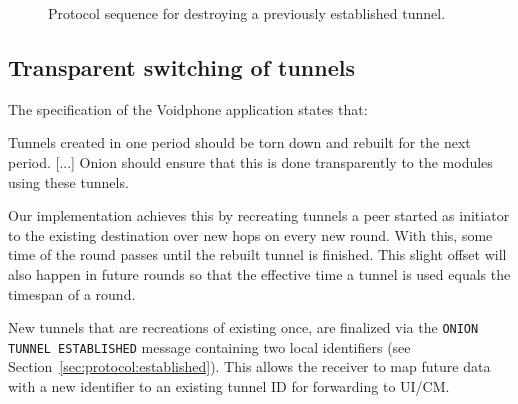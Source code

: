 \documentclass[paper=letter, fontsize=12pt]{article}
\begin{document}
\begin{figure}[ht]
    \caption{Protocol sequence for destroying a previously established tunnel.}
    \label{fig:teardown}
\end{figure}

\subsection{Transparent switching of tunnels}
\label{sec:function:switch}
The specification of the Voidphone application states that:
\begin{displayquote}
Tunnels created in one period should be torn down and rebuilt for the next period. [...]
Onion should ensure that this is done transparently to the modules using these tunnels.
\end{displayquote}

Our implementation achieves this by recreating tunnels a peer started as initiator to the existing destination over new hops on every new round. With this, some time of the round passes until the rebuilt tunnel is finished. This slight offset will also happen in future rounds so that the effective time a tunnel is used equals the timespan of a round.

New tunnels that are recreations of existing once, are finalized via the \texttt{ONION TUNNEL ESTABLISHED} message containing two local identifiers (see Section~\ref{sec:protocol:established}). This allows the receiver to map future data with a new identifier to an existing tunnel ID for forwarding to UI/CM.
\end{document}
